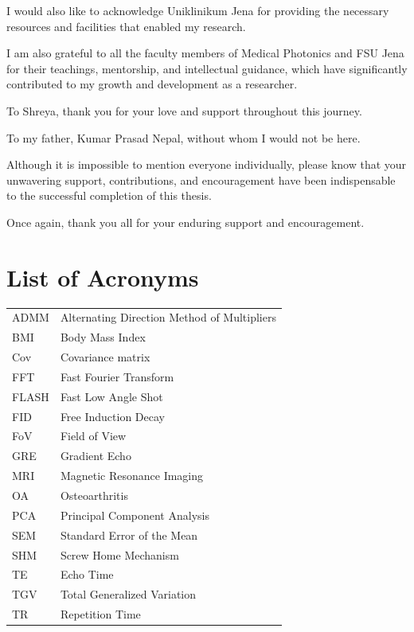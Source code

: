 \documentclass{micro-econ-thesis}
\begin{document}
I would also like to acknowledge Uniklinikum Jena for providing the necessary resources and facilities that enabled my research.


I am also grateful to all the faculty members of Medical Photonics and FSU Jena for their teachings, mentorship, and intellectual guidance, which have significantly contributed to my growth and development as a researcher.
 

To Shreya, thank you for your love and support throughout this journey.

To my father, Kumar Prasad Nepal, without whom I would not be here.

Although it is impossible to mention everyone individually, please know that your unwavering support, contributions, and encouragement have been indispensable to the successful completion of this thesis.

Once again, thank you all for your enduring support and encouragement.

\cleardoublepage
\tableofcontents

\cleardoublepage
{}
{}
\listoffigures
\cleardoublepage
{}
{}
\listoftables

\cleardoublepage
{}
{}
\section*{List of Acronyms}
\begin{tabular}{@{}ll}
ADMM & Alternating Direction Method of Multipliers \\
BMI & Body Mass Index \\
Cov & Covariance matrix \\
FFT & Fast Fourier Transform \\ 
FLASH & Fast Low Angle Shot \\
FID & Free Induction Decay \\
FoV & Field of View \\
GRE & Gradient Echo \\
MRI & Magnetic Resonance Imaging \\
OA & Osteoarthritis\\
PCA & Principal Component Analysis \\
SEM & Standard Error of the Mean \\
SHM & Screw Home Mechanism \\
TE & Echo Time \\
TGV & Total Generalized Variation \\
TR & Repetition Time 

\end{tabular}
\end{document}
